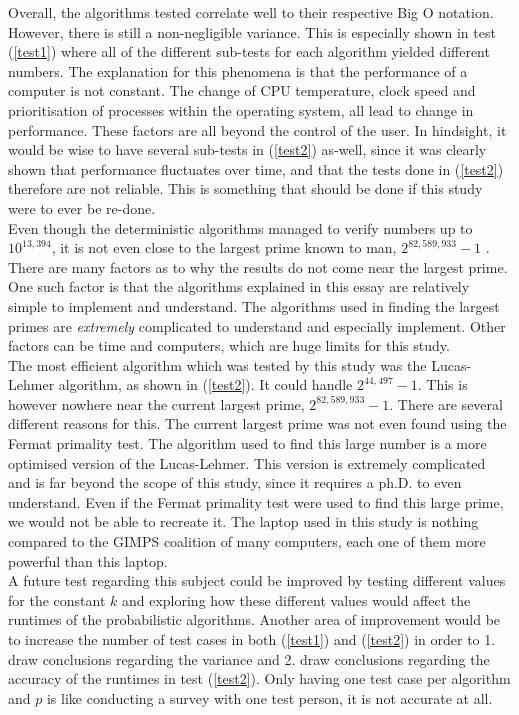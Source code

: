 \documentclass[main.tex]{subfiles}
\begin{document}
Overall, the algorithms tested correlate well to their respective Big O
notation. However, there is still a non-negligible variance. This is especially
shown in test (\ref{test1}) where all of the different sub-tests for each
algorithm yielded different numbers. The explanation for this phenomena is that
the performance of a computer is not constant. The change of CPU temperature,
clock speed and prioritisation of processes within the operating system, all
lead to change in performance. These factors are all beyond the control of the
user. In hindsight, it would be wise to have several sub-tests in (\ref{test2})
as-well, since it was clearly shown that performance fluctuates over time, and
that the tests done in (\ref{test2}) therefore are not reliable. This is
something that should be done if this study were to ever be re-done. \\

Even though the deterministic algorithms managed to verify numbers up to
$10^{13,394}$, it is not even close to the largest prime known to man,
$2^{82,589,933} - 1$ \cite{prime:largest_digits}. There are many factors as to
why the results do not come near the largest prime. One such factor is that the
algorithms explained in this essay are relatively simple to implement and
understand. The
algorithms used in finding the largest primes are \emph{extremely} complicated
to understand and especially implement. Other factors can be time and computers, which are huge limits for this study. \\

The most efficient algorithm which was tested by this study was the Lucas-Lehmer
algorithm, as shown in (\ref{test2}). It could handle $2^{44,497}-1$. This is
however nowhere near the current largest prime, $2^{82,589,933}-1$. There are
several different reasons for this. The current largest prime was not even found
using the Fermat primality test. The algorithm used to find this large number is
a more optimised version of the Lucas-Lehmer. This version is extremely
complicated and is far beyond the scope of this study, since it requires a ph.D.
to even understand. Even if the Fermat primality test were used to find this
large prime, we would not be able to recreate it. The laptop used in this study
is nothing compared to the GIMPS coalition of many computers, each
one of them more powerful than this laptop. \\

A future test regarding this subject could be improved by testing different
values for the constant $k$ and exploring how these different values would
affect the runtimes of the probabilistic algorithms. Another area of improvement
would be to increase the number of test cases in both (\ref{test1}) and
(\ref{test2}) in order to 1. draw conclusions regarding the variance and 2. draw
conclusions regarding the accuracy of the runtimes in test (\ref{test2}). Only
having one test case per algorithm and $p$ is like conducting a survey with one
test person, it is not accurate at all. \\
\end{document}
